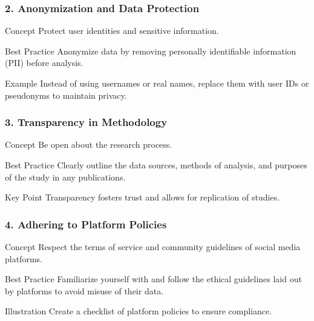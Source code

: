 \documentclass{beamer}
\begin{document}
\begin{frame}[fragile]
    \frametitle{2. Anonymization and Data Protection}
    
    \begin{block}{Concept}
        Protect user identities and sensitive information.
    \end{block}
    
    \begin{block}{Best Practice}
        Anonymize data by removing personally identifiable information (PII) before analysis.
    \end{block}
    
    \begin{block}{Example}
        Instead of using usernames or real names, replace them with user IDs or pseudonyms to maintain privacy.
    \end{block}
\end{frame}

\begin{frame}[fragile]
    \frametitle{3. Transparency in Methodology}
    
    \begin{block}{Concept}
        Be open about the research process.
    \end{block}
    
    \begin{block}{Best Practice}
        Clearly outline the data sources, methods of analysis, and purposes of the study in any publications.
    \end{block}
    
    \begin{block}{Key Point}
        Transparency fosters trust and allows for replication of studies.
    \end{block}
\end{frame}

\begin{frame}[fragile]
    \frametitle{4. Adhering to Platform Policies}

    \begin{block}{Concept}
        Respect the terms of service and community guidelines of social media platforms.
    \end{block}
    
    \begin{block}{Best Practice}
        Familiarize yourself with and follow the ethical guidelines laid out by platforms to avoid misuse of their data.
    \end{block}
    
    \begin{block}{Illustration}
        Create a checklist of platform policies to ensure compliance.
    \end{block}
\end{frame}
\end{document}
